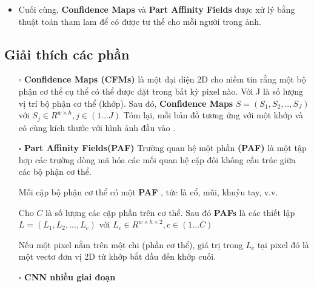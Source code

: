 \begin{itemize} %
\item Cuối cùng, \textbf{Confidence Maps} và \textbf{Part Affinity Fields} được xử lý bằng thuật toán tham lam để có được tư thế cho mỗi người trong ảnh.
\end{itemize}

\subsection{Giải thích các phần}
\begin{itemize}
  \item[$\square$] \textbf{Confidence Maps (CFMs)} là một đại diện 2D cho niềm tin rằng một bộ phận cơ thể cụ thể có thể được đặt trong bất kỳ pixel nào. Với J là số lượng vị trí bộ phận cơ thể (khớp). Sau đó, \textbf{Confidence Maps} $S = (S_1, S_2, .., S_J)$ với $S_j \in R^{w \times h},j \in (1 \ldots J)$
  Tóm lại, mỗi bản đồ tương ứng với một khớp và có cùng kích thước với hình ảnh đầu vào .

  \item[$\square$] \textbf{Part Affinity Fields(PAF)}
  Trường quan hệ một phần \textbf{(PAF)} là một tập hợp các trường dòng mã hóa các mối quan hệ cặp đôi không cấu trúc giữa các bộ phận cơ thể.

Mỗi cặp bộ phận cơ thể có một \textbf{PAF} , tức là cổ, mũi, khuỷu tay, v.v.

Cho $C$ là số lượng các cặp phần trên cơ thể. Sau đó \textbf{PAFs} là các thiết lập \textbf{$L = (L_1, L_2, ..., L_c)$} với \textbf{$L_c \in R^{w \times h \times 2},c \in (1 \ldots C)$}

Nếu một pixel nằm trên một chi (phần cơ thể), giá trị trong $L_c$ tại pixel đó là một vectơ đơn vị 2D từ khớp bắt đầu đến khớp cuối.
\item[$\square$] \textbf{CNN nhiều giai đoạn}


\end{itemize}
